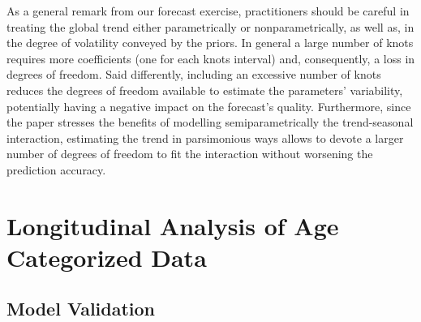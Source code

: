 \documentclass{article}\usepackage[]{graphicx}\usepackage[]{color}
\begin{document}
As a general remark from our forecast exercise, practitioners should be careful in treating the global trend either parametrically or nonparametrically, as well as, in the degree of volatility conveyed by the priors. 
In general a large number of knots requires more coefficients (one for each knots interval) and, consequently, a loss in degrees of freedom. Said differently, including an excessive number of knots reduces the degrees of freedom available to estimate the parameters' variability, potentially having a negative impact on the forecast's quality. 
Furthermore, since the paper stresses the benefits of modelling semiparametrically the trend-seasonal interaction, estimating the trend in  parsimonious ways allows to devote a larger number of degrees of freedom to fit the interaction without worsening the prediction accuracy.


\section{Longitudinal Analysis of Age Categorized Data} \label{disaggregated results}
\subsection{Model Validation} \label{model_disaggregation}
\end{document}
